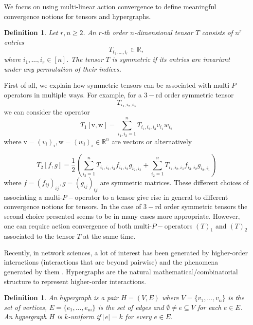 \documentclass[11pt]{article}
\newtheorem{definition}[theorem]{Definition}
\def\R{\mathbb{R}}
\begin{document}
We focus on using multi-linear action convergence to define meaningful convergence notions for tensors and hypergraphs.

\begin{definition}
Let $r,n\geq 2$. An $r$-th order $n$-dimensional \emph{tensor} $T$ consists of $n^r$ entries
\begin{equation*}
    T_{i_1,\ldots,i_r}\in \mathbb{R},
\end{equation*}
where $i_1,\dots,i_r\in[n]$.%
\newline The tensor $T$ is \emph{symmetric} if its entries are invariant under any permutation of their indices.\newline
\end{definition}
First of all, we explain how symmetric tensors can be associated with multi-$P-$operators in multiple ways. For example, for a $3-$rd order symmetric tensor 
$$
T_{i_1,i_2, i_3}
$$
we can consider the operator
$$
T_1[\mathrm{v},\mathrm{w}]=\sum^n_{i_1,i_2=1}T_{i_1,i_2, i_3}v_{i_1}w_{i_2}
$$
where $\mathrm{v}=(v_i)_i,\mathrm{w}=(w_i)_i\in \R^n$ are vectors or alternatively

$$
T_2[f,g]=\frac{1}{2}(\sum^n_{i_2=1}T_{i_1,i_2,i_3}f_{i_1,i_2}g_{i_2,i_3} +\sum^n_{i_2=1}T_{i_1,i_2,i_3}f_{i_3,i_2}g_{i_2,i_1})
$$
where $f=(f_{ij})_{ij},g=(g_{ij})_{ij}$ are symmetric matrices. These different choices of associating a multi-$P-$operator to a tensor give rise in general to different convergence notions for tensors. In the case of $3-$rd order symmetric tensors the second choice presented seems to be in many cases more appropriate. However, one can require action convergence of both multi-$P-$operators $(T)_1$ and $(T)_2$ associated to the tensor $T$ at the same time.

Recently, in network sciences, a lot of interest has been generated by higher-order interactions (interactions that are beyond pairwise) and the phenomena generated by them \cite{HypergraphsNetworks,HigerOrdIntBook,carletti2020dynamical,majhi2022dynamics,MHJ,HypergraphsDynamics,Bohle_2021,JOST2019870,JostMulasBook}. Hypergraphs are the natural mathematical/combinatorial structure to represent higher-order interactions. 

\begin{definition}
 An \emph{hypergraph} is a pair $H=(V,E)$ where $V=\{v_1,\ldots,v_n\}$ is the set of \emph{vertices}, $E=\{e_1,\ldots,e_m\}$ is the set of \emph{edges} and $\emptyset \neq e \subseteq V$ for each $e\in E$.\newline
 An hypergraph $H$ is $k$\emph{-uniform} if $|e|=k$ for every $e\in E$.
 \end{definition}
\end{document}
